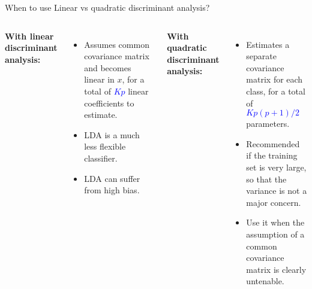 \begin{frame}{When to use Linear vs quadratic discriminant analysis?}



\begin{columns}[T]
  \textbf{With linear discriminant analysis: }
    \begin{itemize}
        \item<1-> Assumes common covariance matrix and becomes linear in $x$, for a total of \textcolor{blue}{$Kp$} linear coeﬃcients to estimate. 

        \item<3-> LDA is a much less flexible classifier. 

        \item<5-> LDA can suﬀer from high bias.

    \end{itemize}


   \textbf{With quadratic discriminant analysis:}
    \begin{itemize}
        \item<2->Estimates a separate covariance matrix for each class, for a total of \textcolor{blue}{$Kp(p+1)/2$} parameters. 

        \item<4-> Recommended if the training set is very large, so that the variance is not a major concern. 
        
        \item<6-> Use it when the assumption of a common covariance matrix is clearly untenable.
    \end{itemize}
\end{columns}

\end{frame}